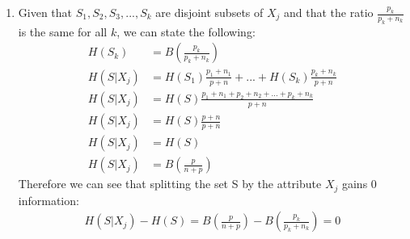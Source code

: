 \documentclass[11pt]{article}
\newcommand{\solution}[1]{{{\color{blue}{\bf Solution:} {#1}}}}
\begin{document}
\begin{enumerate}
\item
\solution{
Given that $S_1, S_2, S_3,...,S_k$ are disjoint subsets of $X_j$ and that the ratio $\tfrac{p_k}{p_{k}+n_k}$ is the same for all $k$, we can state the following:
\begin{align}
H(S_k) &= B(\tfrac{p_k}{p_k+n_k}) \\
H(S | X_j) &= H(S_1)\tfrac{p_1+n_1}{p+n} + ... + H(S_k)\tfrac{p_k+n_k}{p+n} \\
H(S | X_j) &= H(S)\tfrac{p_1+n_1+p_2+n_2+...+p_k+n_k}{p+n} \\
H(S | X_j) &= H(S)\tfrac{p+n}{p+n} \\
H(S | X_j) &= H(S) \\
H(S | X_j) &= B(\tfrac{p}{n+p})
\end{align}
Therefore we can see that splitting the set S by the attribute $X_j$ gains 0 information:
\begin{align}
H(S | X_j) - H(S)= B(\tfrac{p}{n+p}) - B(\tfrac{p_k}{p_k+n_k}) = 0
\end{align}
}
\end{enumerate}
\newpage
\end{document}
